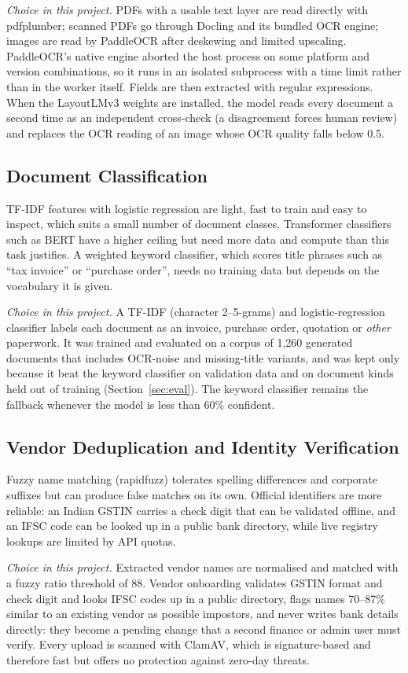 \emph{Choice in this project.} PDFs with a usable text layer are read directly with pdfplumber; scanned PDFs go through Docling and its bundled OCR engine; images are read by PaddleOCR after deskewing and limited upscaling. PaddleOCR's native engine aborted the host process on some platform and version combinations, so it runs in an isolated subprocess with a time limit rather than in the worker itself. Fields are then extracted with regular expressions. When the LayoutLMv3 weights are installed, the model reads every document a second time as an independent cross-check (a disagreement forces human review) and replaces the OCR reading of an image whose OCR quality falls below 0.5.

\subsection{Document Classification}
TF-IDF features with logistic regression are light, fast to train and easy to inspect, which suits a small number of document classes. Transformer classifiers such as BERT have a higher ceiling but need more data and compute than this task justifies. A weighted keyword classifier, which scores title phrases such as ``tax invoice'' or ``purchase order'', needs no training data but depends on the vocabulary it is given.

\emph{Choice in this project.} A TF-IDF (character 2--5-grams) and logistic-regression classifier labels each document as an invoice, purchase order, quotation or \emph{other} paperwork. It was trained and evaluated on a corpus of 1,260 generated documents that includes OCR-noise and missing-title variants, and was kept only because it beat the keyword classifier on validation data and on document kinds held out of training (Section~\ref{sec:eval}). The keyword classifier remains the fallback whenever the model is less than 60\% confident.

\subsection{Vendor Deduplication and Identity Verification}
Fuzzy name matching (rapidfuzz) tolerates spelling differences and corporate suffixes but can produce false matches on its own. Official identifiers are more reliable: an Indian GSTIN carries a check digit that can be validated offline, and an IFSC code can be looked up in a public bank directory, while live registry lookups are limited by API quotas.

\emph{Choice in this project.} Extracted vendor names are normalised and matched with a fuzzy ratio threshold of 88. Vendor onboarding validates GSTIN format and check digit and looks IFSC codes up in a public directory, flags names 70--87\% similar to an existing vendor as possible impostors, and never writes bank details directly: they become a pending change that a second finance or admin user must verify. Every upload is scanned with ClamAV, which is signature-based and therefore fast but offers no protection against zero-day threats.

